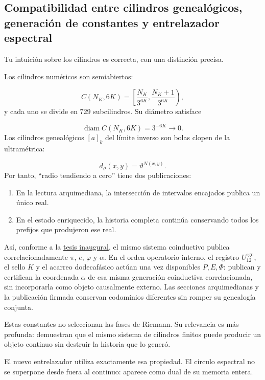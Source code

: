 \subsection{Compatibilidad entre cilindros genealógicos, generación de constantes y entrelazador espectral}
Tu intuición sobre los cilindros es correcta, con una distinción precisa.\par
Los cilindros numéricos son semiabiertos:\par
\[
C(N_K,6K)
=
\left[
\frac{N_K}{3^{6K}},
\frac{N_K+1}{3^{6K}}
\right),
\]
y cada uno se divide en 729 subcilindros. Su diámetro satisface\par
\[
\operatorname{diam}C(N_K,6K)=3^{-6K}\longrightarrow0.
\]
Los cilindros genealógicos \([a]_k\) del límite inverso son bolas clopen de la ultramétrica:\par
\[
d_\vartheta(x,y)
=
\vartheta^{N(x,y)}.
\]
Por tanto, “radio tendiendo a cero” tiene dos publicaciones:\par
\begin{enumerate}
\item En la lectura arquimediana, la intersección de intervalos encajados publica un único real.
\item En el estado enriquecido, la historia completa continúa conservando todos los prefijos que produjeron ese real.
\end{enumerate}
Así, conforme a la \hyperref[sec:tesis-inaugural-helicoidal-hmt-md]{tesis inaugural}, el mismo sistema coinductivo publica correlacionadamente \(\pi\), \(e\), \(\varphi\) y \(\alpha\). En el orden operatorio interno, el registro \(U_{12}^{\mathrm{sgn}}\), el sello \(K\) y el acarreo dodecafásico actúan una vez disponibles \(P,E,\Phi\): publican y certifican la coordenada \(\alpha\) de esa misma generación coinductiva correlacionada, sin incorporarla como objeto causalmente externo. Las secciones arquimedianas y la publicación firmada conservan codominios diferentes sin romper su genealogía conjunta.\par
Estas constantes no seleccionan las fases de Riemann. Su relevancia es más profunda: demuestran que el mismo sistema de cilindros finitos puede producir un objeto continuo sin destruir la historia que lo generó.\par
El nuevo entrelazador utiliza exactamente esa propiedad. El círculo espectral no se superpone desde fuera al continuo: aparece como dual de su memoria entera.\par
{}
